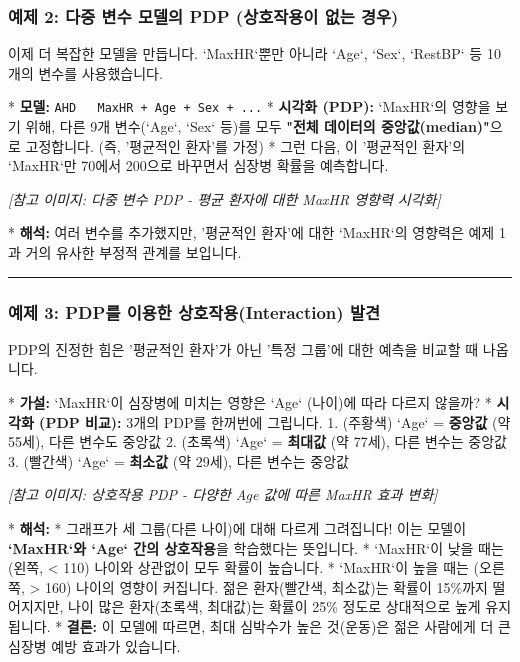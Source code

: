 \documentclass[11pt,a4paper]{book}
\theoremstyle{definition}
\begin{document}
\subsubsection{예제 2: 다중 변수 모델의 PDP (상호작용이 없는 경우)}

이제 더 복잡한 모델을 만듭니다. `MaxHR`뿐만 아니라 `Age`, `Sex`, `RestBP` 등 10개의 변수를 사용했습니다.

* \textbf{모델:} \texttt{AHD ~ MaxHR + Age + Sex + ...}
* \textbf{시각화 (PDP):} `MaxHR`의 영향을 보기 위해, 다른 9개 변수(`Age`, `Sex` 등)를 모두 \textbf{"전체 데이터의 중앙값(median)"}으로 고정합니다. (즉, '평균적인 환자'를 가정)
* 그런 다음, 이 '평균적인 환자'의 `MaxHR`만 70에서 200으로 바꾸면서 심장병 확률을 예측합니다.

\textit{[참고 이미지: 다중 변수 PDP - 평균 환자에 대한 MaxHR 영향력 시각화]}

* \textbf{해석:} 여러 변수를 추가했지만, '평균적인 환자'에 대한 `MaxHR`의 영향력은 예제 1과 거의 유사한 부정적 관계를 보입니다.

\vspace{0.5cm}\hrule\vspace{0.5cm}
\subsubsection{예제 3: PDP를 이용한 상호작용(Interaction) 발견}

PDP의 진정한 힘은 '평균적인 환자'가 아닌 '특정 그룹'에 대한 예측을 비교할 때 나옵니다.

* \textbf{가설:} `MaxHR`이 심장병에 미치는 영향은 `Age` (나이)에 따라 다르지 않을까?
* \textbf{시각화 (PDP 비교):} 3개의 PDP를 한꺼번에 그립니다.
    1.  (주황색) `Age` = \textbf{중앙값} (약 55세), 다른 변수도 중앙값
    2.  (초록색) `Age` = \textbf{최대값} (약 77세), 다른 변수는 중앙값
    3.  (빨간색) `Age` = \textbf{최소값} (약 29세), 다른 변수는 중앙값

\textit{[참고 이미지: 상호작용 PDP - 다양한 Age 값에 따른 MaxHR 효과 변화]}

* \textbf{해석:}
    * 그래프가 세 그룹(다른 나이)에 대해 다르게 그려집니다! 이는 모델이 \textbf{`MaxHR`와 `Age` 간의 상호작용}을 학습했다는 뜻입니다.
    * `MaxHR`이 낮을 때는 (왼쪽, < 110) 나이와 상관없이 모두 확률이 높습니다.
    * `MaxHR`이 높을 때는 (오른쪽, > 160) 나이의 영향이 커집니다. 젊은 환자(빨간색, 최소값)는 확률이 15\%까지 떨어지지만, 나이 많은 환자(초록색, 최대값)는 확률이 25\% 정도로 상대적으로 높게 유지됩니다.
    * \textbf{결론:} 이 모델에 따르면, 최대 심박수가 높은 것(운동)은 젊은 사람에게 더 큰 심장병 예방 효과가 있습니다.
\end{document}
